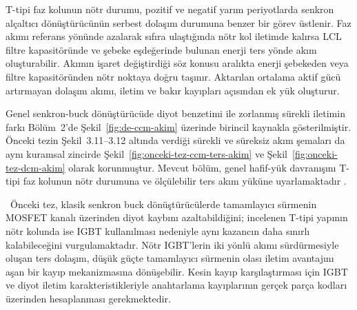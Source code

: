 T-tipi faz kolunun nötr durumu, pozitif ve negatif yarım periyotlarda senkron alçaltıcı dönüştürücünün serbest dolaşım durumuna benzer bir görev üstlenir. Faz akımı referans yönünde azalarak sıfıra ulaştığında nötr kol iletimde kalırsa LCL filtre kapasitöründe ve şebeke eşdeğerinde bulunan enerji ters yönde akım oluşturabilir. Akımın işaret değiştirdiği söz konusu aralıkta enerji şebekeden veya filtre kapasitöründen nötr noktaya doğru taşınır. Aktarılan ortalama aktif gücü artırmayan dolaşım akımı, iletim ve bakır kayıpları açısından ek yük oluşturur.

Genel senkron-buck dönüştürücüde diyot benzetimi ile zorlanmış sürekli iletimin farkı Bölüm~2'de Şekil~\ref{fig:de-ccm-akim} üzerinde birincil kaynakla gösterilmiştir. Önceki tezin Şekil~3.11--3.12 altında verdiği sürekli ve süreksiz akım şemaları da aynı kuramsal zincirde Şekil~\ref{fig:onceki-tez-ccm-ters-akim} ve Şekil~\ref{fig:onceki-tez-dcm-akim} olarak korunmuştur. Mevcut bölüm, genel hafif-yük davranışını T-tipi faz kolunun nötr durumuna ve ölçülebilir ters akım yüküne uyarlamaktadır \citep{Erickson2001,Mohan2003,Chen2010}.

\eskitezetiketi\ Önceki tez, klasik senkron buck dönüştürücülerde tamamlayıcı sürmenin MOSFET kanalı üzerinden diyot kaybını azaltabildiğini; incelenen T-tipi yapının nötr kolunda ise IGBT kullanılması nedeniyle aynı kazancın daha sınırlı kalabileceğini vurgulamaktadır. Nötr IGBT'lerin iki yönlü akımı sürdürmesiyle oluşan ters dolaşım, düşük güçte tamamlayıcı sürmenin olası iletim avantajını aşan bir kayıp mekanizmasına dönüşebilir. Kesin kayıp karşılaştırması için IGBT ve diyot iletim karakteristikleriyle anahtarlama kayıplarının gerçek parça kodları üzerinden hesaplanması gerekmektedir.

